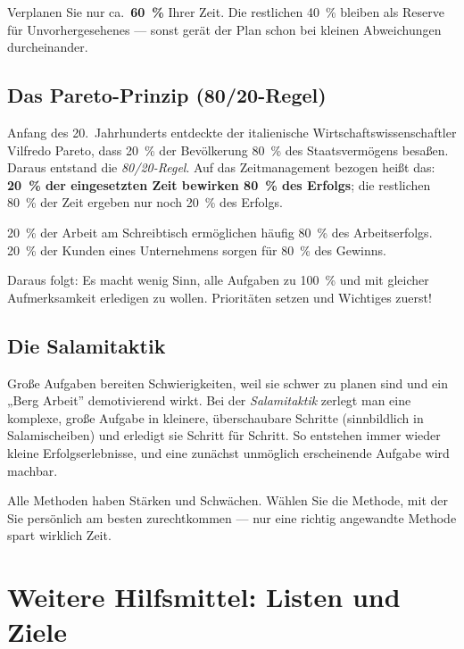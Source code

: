 \documentclass[11pt, a4paper]{article}
\begin{document}
\begin{merksatz}
Verplanen Sie nur ca.\ \textbf{60~\%} Ihrer Zeit. Die restlichen 40~\% bleiben als Reserve
für Unvorhergesehenes --- sonst gerät der Plan schon bei kleinen Abweichungen durcheinander.
\end{merksatz}

\subsection{Das Pareto-Prinzip (80/20-Regel)}

Anfang des 20.\ Jahrhunderts entdeckte der italienische Wirtschaftswissenschaftler
Vilfredo Pareto, dass 20~\% der Bevölkerung 80~\% des Staatsvermögens besaßen. Daraus
entstand die \emph{80/20-Regel}. Auf das Zeitmanagement bezogen heißt das: \textbf{20~\%
der eingesetzten Zeit bewirken 80~\% des Erfolgs}; die restlichen 80~\% der Zeit ergeben
nur noch 20~\% des Erfolgs.

\begin{beispiel}
20~\% der Arbeit am Schreibtisch ermöglichen häufig 80~\% des Arbeitserfolgs.\\
20~\% der Kunden eines Unternehmens sorgen für 80~\% des Gewinns.
\end{beispiel}

Daraus folgt: Es macht wenig Sinn, alle Aufgaben zu 100~\% und mit gleicher Aufmerksamkeit
erledigen zu wollen. Prioritäten setzen und Wichtiges zuerst!

\subsection{Die Salamitaktik}

Große Aufgaben bereiten Schwierigkeiten, weil sie schwer zu planen sind und ein „Berg
Arbeit” demotivierend wirkt. Bei der \emph{Salamitaktik} zerlegt man eine komplexe,
große Aufgabe in kleinere, überschaubare Schritte (sinnbildlich in Salamischeiben) und
erledigt sie Schritt für Schritt. So entstehen immer wieder kleine Erfolgserlebnisse,
und eine zunächst unmöglich erscheinende Aufgabe wird machbar.

\begin{merksatz}
Alle Methoden haben Stärken und Schwächen. Wählen Sie die Methode, mit der Sie persönlich
am besten zurechtkommen --- nur eine richtig angewandte Methode spart wirklich Zeit.
\end{merksatz}

\section{Weitere Hilfsmittel: Listen und Ziele}
\end{document}

